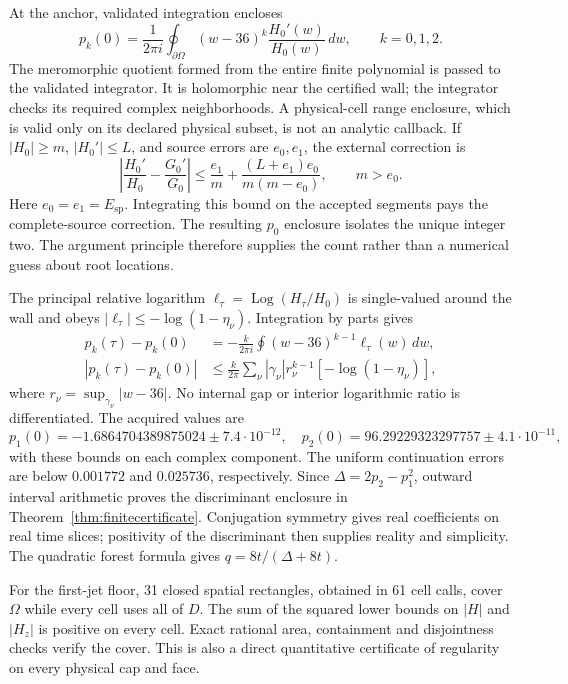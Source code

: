 At the anchor, validated integration encloses
\begin{equation}
 p_k(0)=\frac1{2\pi i}\oint_{\partial\Omega}
       (w-36)^k\frac{H_0'(w)}{H_0(w)}\,dw,\qquad k=0,1,2.
 \label{eq:anchormoments}
\end{equation}
The meromorphic quotient formed from the entire finite polynomial is passed
to the validated integrator. It is holomorphic near the certified wall;
the integrator checks its required complex neighborhoods. A physical-cell range enclosure, which is valid only on its
declared physical subset, is not an analytic callback.
If \(|H_0|\ge m\), \(|H_0'|\le L\), and source errors are
\(e_0,e_1\), the external correction is
\begin{equation}
 \left|\frac{H_0'}{H_0}-\frac{G_0'}{G_0}\right|
 \le\frac{e_1}{m}+\frac{(L+e_1)e_0}{m(m-e_0)},\qquad m>e_0.
 \label{eq:quotienterror}
\end{equation}
Here \(e_0=e_1=E_{\mathrm{sp}}\). Integrating this bound on the
accepted segments pays the complete-source correction.
The resulting \(p_0\) enclosure isolates the unique integer two.
The argument principle therefore supplies the count rather than a
numerical guess about root locations.

The principal relative logarithm
\(\ell_\tau=\operatorname{Log}(H_\tau/H_0)\) is single-valued around
the wall and obeys \(|\ell_\tau|\le-\log(1-\eta_\nu)\).
Integration by parts gives
\begin{align}
 p_k(\tau)-p_k(0)
   &=-\frac{k}{2\pi i}\oint(w-36)^{k-1}\ell_\tau(w)\,dw,\nonumber\\
 |p_k(\tau)-p_k(0)|
   &\le\frac{k}{2\pi}\sum_\nu
      |\gamma_\nu|r_\nu^{k-1}[-\log(1-\eta_\nu)],
 \label{eq:logtransfer}
\end{align}
where \(r_\nu=\sup_{\gamma_\nu}|w-36|\). No internal gap or
interior logarithmic ratio is differentiated. The acquired values are
\[
 p_1(0)=-1.6864704389875024\pm7.4\cdot10^{-12},\quad
 p_2(0)=96.29229323297757\pm4.1\cdot10^{-11},
\]
with these bounds on each complex component. The uniform continuation
errors are below \(0.001772\) and \(0.025736\), respectively.
Since \(\Delta=2p_2-p_1^2\), outward interval arithmetic proves the
discriminant enclosure in Theorem~\ref{thm:finitecertificate}.
Conjugation symmetry gives real coefficients on real time slices;
positivity of the discriminant then supplies reality and simplicity.
The quadratic forest formula gives \(q=8t/(\Delta+8t)\).

For the first-jet floor, 31 closed spatial rectangles, obtained in
61 cell calls, cover \(\Omega\) while every cell uses all of \(D\).
The sum of the squared lower bounds on \(|H|\) and \(|H_z|\) is
positive on every cell. Exact rational area, containment and disjointness
checks verify the cover. This is also a direct quantitative certificate
of regularity on every physical cap and face.

